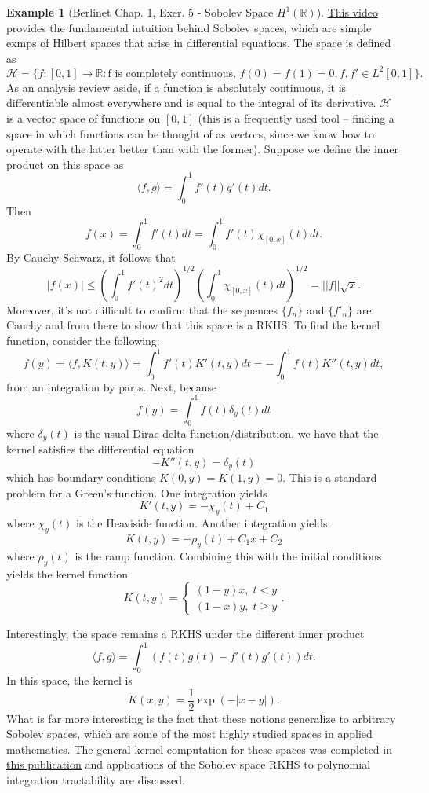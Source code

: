 \documentclass{article}
\theoremstyle{definition}
\newtheorem{exmp}[thm]{Example}
\theoremstyle{remark}
\numberwithin{equation}{section}
\begin{document}
\begin{exmp}[Berlinet Chap. 1, Exer. 5 - Sobolev Space $H^1(\mathbb{R})$]
\href{https://www.youtube.com/watch?v=MdGeC-JNaVY}{This video} provides the fundamental intuition behind Sobolev spaces, which are simple exmps of Hilbert spaces that arise in differential equations. The space is defined as 
$$\mathcal{H} = \{ f : [0, 1] \rightarrow \mathbb{R} : \text{f is completely continuous, } f(0) = f(1) = 0, f, f' \in L^2[0, 1] \}.$$
As an analysis review aside, if a function is absolutely continuous, it is differentiable almost everywhere and is equal to the integral of its derivative. $\mathcal{H}$ is a vector space of functions on $[0, 1]$ (this is a frequently used tool -- finding a space in which functions can be thought of as vectors, since we know how to operate with the latter better than with the former). Suppose we define the inner product on this space as 
$$\langle f, g \rangle = \int _0 ^1 f'(t) g'(t) dt.$$
Then 
$$f(x) = \int _0 ^1 f'(t) dt = \int _0 ^ 1 f'(t) \chi _{[0, x]} (t) dt. $$
By Cauchy-Schwarz, it follows that 
$$|f(x)| \leq \left( \int _0 ^1 f'(t)^2 dt \right) ^{1/2} \left( \int _0 ^1 \chi _{[0, x]} (t) dt \right) ^{1/2} = || f|| \sqrt{x}. $$
Moreover, it's not difficult to confirm that the sequences $\{ f_n \}$ and $\{ f' _n \}$ are Cauchy and from there to show that this space is a RKHS. To find the kernel function, consider the following: 
$$f(y) = \langle f, K(t , y) \rangle = \int _0 ^1 f'(t) K' (t, y) dt = - \int _0 ^1 f(t) K''(t , y) dt, $$
from an integration by parts. Next, because 
$$f(y) = \int _0 ^1 f(t) \delta _y (t) dt $$
where $\delta _y (t)$ is the usual Dirac delta function/distribution, we have that the kernel satisfies the differential equation 
$$- K''(t, y) = \delta _y (t)$$
which has boundary conditions $K(0, y) = K(1,y) = 0$. This is a standard problem for a Green's function. One integration yields 
$$K'(t , y) = - \chi _y (t) + C_1 $$
where $\chi _y (t)$ is the Heaviside function. Another integration yields 
$$K(t, y) = - \rho _y (t) + C_1 x + C_2 $$
where $\rho _y (t)$ is the ramp function. Combining this with the initial conditions yields the kernel function 
$$K(t, y) = \begin{cases} (1-y)x, \; t < y \\ (1-x)y, \; t \geq y \end{cases}. $$
\end{exmp}
Interestingly, the space remains a RKHS under the different inner product
$$\langle f, g \rangle = \int _0 ^1 (f(t) g(t) - f'(t) g'(t)) dt.$$
In this space, the kernel is 
$$K(x, y) = \frac{1}{2} \exp (- |x-y|). $$ What is far more interesting is the fact that these notions generalize to arbitrary Sobolev spaces, which are some of the most highly studied spaces in applied mathematics. The general kernel computation for these spaces was completed in \href{https://arxiv.org/pdf/1709.02568.pdf}{this publication} and applications of the Sobolev space RKHS to polynomial integration tractability are discussed. 
\end{document}
